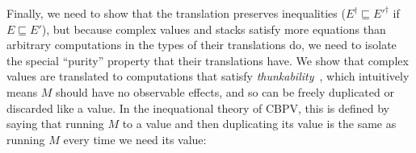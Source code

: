 \documentclass[acmsmall,screen,12pt]{acmart}
\renewcommand{\u}{\underline}
\newcommand{\cbpv}{CBPV}
\newcommand{\cbpvstar}{CBPV*}
\newcommand{\ltdyn}{\sqsubseteq}
\newcommand{\simp}[1]{{#1}^{\dag}}
\newcommand{\kw}[1]{\texttt{#1}\,\,}
\newcommand{\ret}{\kw{ret}}
\begin{document}
Finally, we need to show that the translation preserves inequalities
($\simp{E} \ltdyn \simp{E'}$ if $E \ltdyn E'$), but because complex
values and stacks satisfy more equations than arbitrary computations in
the types of their translations do, we need to isolate the special
``purity'' property that their translations have.
%
We show that complex values are translated to computations that satisfy
\emph{thunkability}~\cite{munchmaccagnoni14nonassociative}, which
%
intuitively means $M$ should have no observable effects, and so
can be freely duplicated or discarded like a value.
%
In the inequational theory of \cbpv\/, this is defined by saying that
running $M$ to a value and then duplicating its value is the same as
running $M$ every time we need its value:
\end{document}

